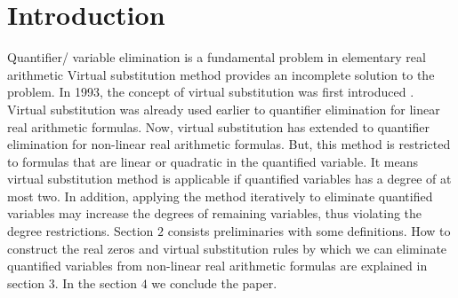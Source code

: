 \section{Introduction}
\label{sec:introduction}
Quantifier/ variable elimination is a fundamental problem in elementary real arithmetic Virtual substitution method provides an incomplete solution to the problem. In 1993, the concept of virtual substitution was first introduced \cite{weispfenning}. Virtual substitution was already used earlier to quantifier elimination for linear real arithmetic formulas. Now, virtual substitution has extended to quantifier elimination for non-linear real arithmetic formulas. But, this method is restricted
to formulas that are linear or quadratic in the quantified variable. It means virtual substitution method is applicable if quantified variables has a degree of at most two. In addition, applying the method iteratively to eliminate quantified variables may increase the degrees of remaining variables, thus violating the degree restrictions.\newline
Section $2$ consists preliminaries with some definitions. How to construct the real zeros and virtual substitution rules by which we can eliminate quantified variables from non-linear real arithmetic formulas are explained in section $3$. In the section $4$ we conclude the paper.
